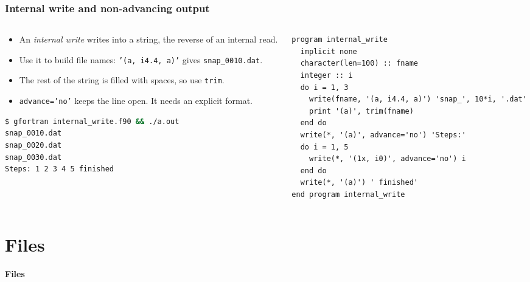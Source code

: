 \begin{frame}[fragile]
  \frametitle{Internal write and non-advancing output}
  \begin{columns}[T]
    \begin{column}{0.45\textwidth}
      \begin{itemize}
        \item An \emph{internal write} writes into a string, the reverse of an internal read.
        \item Use it to build file names: \texttt{'(a, i4.4, a)'} gives \texttt{snap\_0010.dat}.
        \item The rest of the string is filled with spaces, so use \texttt{trim}.
        \item \texttt{advance='no'} keeps the line open. It needs an explicit format.
      \end{itemize}
      \begin{lstlisting}[language=bash]
$ gfortran internal_write.f90 && ./a.out
snap_0010.dat
snap_0020.dat
snap_0030.dat
Steps: 1 2 3 4 5 finished
      \end{lstlisting}
    \end{column}

    \begin{column}{0.55\textwidth}
      \begin{lstlisting}
program internal_write
  implicit none
  character(len=100) :: fname
  integer :: i
  do i = 1, 3
    write(fname, '(a, i4.4, a)') 'snap_', 10*i, '.dat'
    print '(a)', trim(fname)
  end do
  write(*, '(a)', advance='no') 'Steps:'
  do i = 1, 5
    write(*, '(1x, i0)', advance='no') i
  end do
  write(*, '(a)') ' finished'
end program internal_write
      \end{lstlisting}
    \end{column}
  \end{columns}
\end{frame}


\section{Files}

\begin{frame}
  \centering
  \Huge \textbf{Files}
\end{frame}


